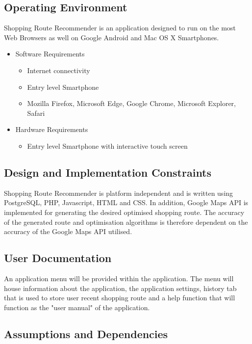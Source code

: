 \documentclass[10pt, a4paper, onecolumn]{scrartcl}
\begin{document}
		\subsection{Operating Environment}
		
			Shopping Route Recommender is an application designed to run on the most Web Browsers as well on Google Android and Mac OS X Smartphones. 
			
			\begin{itemize}
				\item Software Requirements
				\begin{itemize}
					\item Internet connectivity
					\item Entry level Smartphone
					\item Mozilla Firefox, Microsoft Edge, Google Chrome, Microsoft Explorer, Safari
				\end{itemize}
				\item Hardware Requirements
				\begin{itemize}
					\item Entry level Smartphone with interactive touch screen
				\end{itemize}
			\end{itemize}
		
		\subsection{Design and Implementation Constraints} 
		
			Shopping Route Recommender is platform independent and is written using PostgreSQL, PHP, Javascript, HTML and CSS. In addition, Google Maps API is implemented for generating the desired optimised shopping route. The accuracy of the generated route and optimisation algorithms is therefore dependent on the accuracy of the Google Maps API utilised. 
		
		\subsection{User Documentation}
		
		   	An application menu will be provided within the application. The menu will house information about the application, the application settings, history tab that is used to store user recent shopping route and a help function that will function as the "user manual" of the application. 
		
		\subsection{Assumptions and Dependencies}
		
\end{document}
